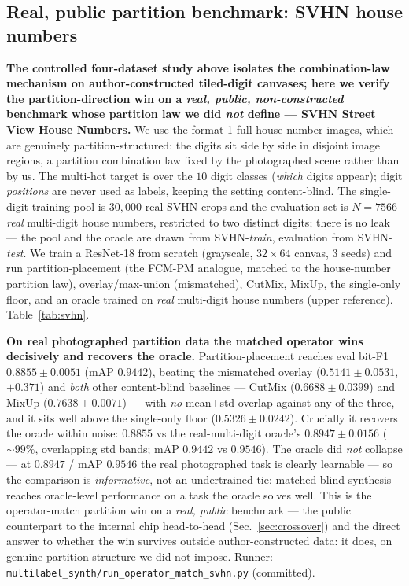 \documentclass[11pt]{article}
\begin{document}
\subsection{Real, public partition benchmark: SVHN house numbers}\label{sec:svhn}
\textbf{The controlled four-dataset study above isolates the combination-law mechanism on
author-constructed tiled-digit canvases; here we verify the partition-direction win on a
\emph{real, public, non-constructed} benchmark whose partition law we did \emph{not} define
--- SVHN Street View House Numbers.} We use the format-1 full house-number images, which are
genuinely partition-structured: the digits sit side by side in disjoint image regions, a
partition combination law fixed by the photographed scene rather than by us. The multi-hot
target is over the $10$ digit classes (\emph{which} digits appear); digit \emph{positions}
are never used as labels, keeping the setting content-blind. The single-digit training pool
is $30{,}000$ real SVHN crops and the evaluation set is $N{=}7566$ \emph{real} multi-digit
house numbers, restricted to two distinct digits; there is no leak --- the pool and the
oracle are drawn from SVHN-\emph{train}, evaluation from SVHN-\emph{test}. We train a
ResNet-18 from scratch (grayscale, $32{\times}64$ canvas, $3$ seeds) and run
partition-placement (the FCM-PM analogue, matched to the house-number partition law),
overlay/max-union (mismatched), CutMix, MixUp, the single-only floor, and an oracle trained
on \emph{real} multi-digit house numbers (upper reference). Table~\ref{tab:svhn}.

\textbf{On real photographed partition data the matched operator wins decisively and
recovers the oracle.} Partition-placement reaches eval bit-F1 $0.8855 \pm 0.0051$ (mAP
$0.9442$), beating the mismatched overlay ($0.5141 \pm 0.0531$, $+0.371$) and \emph{both}
other content-blind baselines --- CutMix ($0.6688 \pm 0.0399$) and MixUp
($0.7638 \pm 0.0071$) --- with \emph{no} mean$\pm$std overlap against any of the three, and
it sits well above the single-only floor ($0.5326 \pm 0.0242$). Crucially it recovers the
oracle within noise: $0.8855$ vs the real-multi-digit oracle's $0.8947 \pm 0.0156$
(${\sim}99\%$, overlapping std bands; mAP $0.9442$ vs $0.9546$). The oracle did \emph{not}
collapse --- at $0.8947$ / mAP $0.9546$ the real photographed task is clearly learnable ---
so the comparison is \emph{informative}, not an undertrained tie: matched blind synthesis
reaches oracle-level performance on a task the oracle solves well. This is the
operator-match partition win on a \emph{real, public} benchmark --- the public counterpart
to the internal chip head-to-head (Sec.~\ref{sec:crossover}) and the direct answer to
whether the win survives outside author-constructed data: it does, on genuine partition
structure we did not impose. Runner:
\texttt{multilabel\_synth/run\_operator\_match\_svhn.py} (committed).
\end{document}
